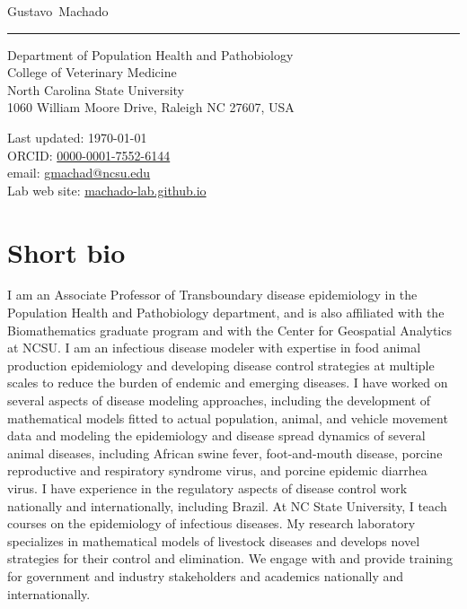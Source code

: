 \documentclass[11pt]{article}
\makeatletter
\newcommand{\NCSU}{North Carolina State University}
\newcommand{\vet}{College of Veterinary Medicine}
\newcommand{\CVM}{Department of Population Health and Pathobiology}
\newcommand{\FirstName}{Gustavo}
\newcommand{\LastName}{Machado}
\newcommand{\MyName}{\FirstName\ \LastName}
\newcommand{\Email}{gmachad@ncsu.edu}
\newcommand{\LabWebsite}{machado-lab.github.io}
\newcommand{\ORCID}{0000-0001-7552-6144}
\newcommand{\Affiliation}{\CVM \\ \vet \\ \NCSU}
\newcommand{\Address}{
  1060 William Moore Drive, Raleigh NC 27607, USA
}
\makeatother
\begin{document}
\thispagestyle{empty}

{\fontsize{22pt}{0}\selectfont\MyName}\\[-0.1cm]
\rule{\textwidth}{0.2pt}
\begin{minipage}[t]{0.595\textwidth}
  \Affiliation
  \\
  \Address
\end{minipage}
\begin{minipage}[t]{0.405\textwidth}
  \begin{flushright}
  Last updated: \monthyear\today
  \\
    ORCID: \href{https://orcid.org/\ORCID}{\ORCID}
    \\
    email: \href{mailto:\Email}{\Email}
    \\
    Lab web site: \href{https://\LabWebsite}{\LabWebsite}
  \end{flushright}
\end{minipage}

\section{Short bio}

I am an Associate Professor of Transboundary disease epidemiology in the Population Health and Pathobiology department, and is also affiliated with the
Biomathematics graduate program and with the Center for Geospatial Analytics at NCSU.
I am an infectious disease modeler with expertise in food animal production epidemiology and developing disease control strategies at multiple scales to reduce the burden of endemic and emerging diseases. I have worked on several aspects of disease modeling approaches, including the development of mathematical models fitted to actual population, animal, and vehicle movement data and modeling the epidemiology and disease spread dynamics of several animal diseases, including African swine fever, foot-and-mouth disease, porcine reproductive and respiratory syndrome virus, and porcine epidemic diarrhea virus. I have experience in the regulatory aspects of disease control work nationally and internationally, including Brazil. At NC State University, I teach courses on the epidemiology of infectious diseases. My research laboratory specializes in mathematical models of livestock diseases and develops novel strategies for their control and elimination. We engage with and provide training for government and industry stakeholders and academics nationally and internationally.
\end{document}
